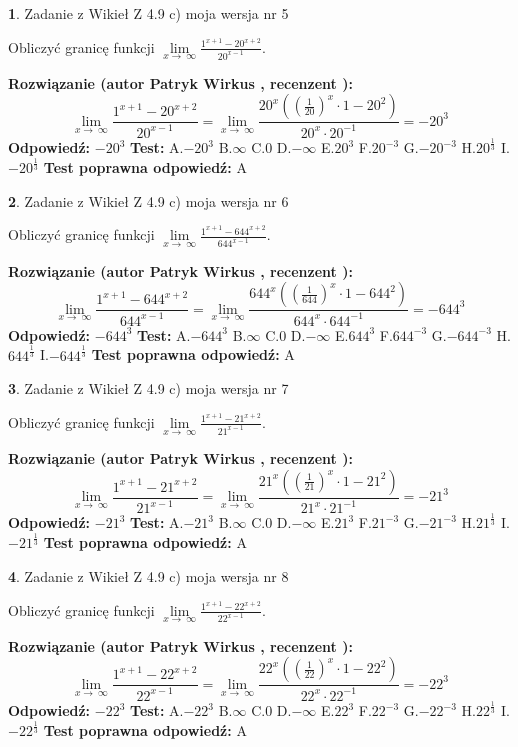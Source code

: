 \documentclass[12pt, a4paper]{article}
\theoremstyle{definition} %
\newtheorem{zad}{}
\newcommand{\zadStart}[1]{\begin{zad}#1\newline}
\newcommand{\zadStop}{\end{zad}}
\newcommand{\rozwStart}[2]{\noindent \textbf{Rozwiązanie (autor #1 , recenzent #2): }\newline}
\newcommand{\rozwStop}{\newline}
\newcommand{\odpStart}{\noindent \textbf{Odpowiedź:}\newline}
\newcommand{\odpStop}{\newline}
\newcommand{\testStart}{\noindent \textbf{Test:}\newline}
\newcommand{\testStop}{\newline}
\newcommand{\kluczStart}{\noindent \textbf{Test poprawna odpowiedź:}\newline}
\newcommand{\kluczStop}{\newline}
\begin{document}
\zadStart{Zadanie z Wikieł Z 4.9 c) moja wersja nr 5}


Obliczyć granicę funkcji  $\lim\limits_{x\to\ \infty}\frac{1^{x+1}-20^{x+2}}{20^{x-1}}$.
\zadStop
\rozwStart{Patryk Wirkus}{}
$$\lim\limits_{x\to\ \infty}\frac{1^{x+1}-20^{x+2}}{20^{x-1}}=\lim\limits_{x\to\ \infty}\frac{20^{x}((\frac{1}{20})^{x}\cdot 1 -20^{2})}{20^{x}\cdot 20^{-1}} = -20^{3}$$
\rozwStop
\odpStart
$-20^{3}$
\odpStop
\testStart
A.$-20^{3}$ B.$\infty$ C.$0$ D.$-\infty$ E.$20^{3}$
F.$20^{-3}$ G.$-20^{-3}$
H.$20^{\frac{1}{3}}$
I.$-20^{\frac{1}{3}}$
\testStop
\kluczStart
A
\kluczStop



\zadStart{Zadanie z Wikieł Z 4.9 c) moja wersja nr 6}


Obliczyć granicę funkcji  $\lim\limits_{x\to\ \infty}\frac{1^{x+1}-644^{x+2}}{644^{x-1}}$.
\zadStop
\rozwStart{Patryk Wirkus}{}
$$\lim\limits_{x\to\ \infty}\frac{1^{x+1}-644^{x+2}}{644^{x-1}}=\lim\limits_{x\to\ \infty}\frac{644^{x}((\frac{1}{644})^{x}\cdot 1 -644^{2})}{644^{x}\cdot 644^{-1}} = -644^{3}$$
\rozwStop
\odpStart
$-644^{3}$
\odpStop
\testStart
A.$-644^{3}$ B.$\infty$ C.$0$ D.$-\infty$ E.$644^{3}$
F.$644^{-3}$ G.$-644^{-3}$
H.$644^{\frac{1}{3}}$
I.$-644^{\frac{1}{3}}$
\testStop
\kluczStart
A
\kluczStop



\zadStart{Zadanie z Wikieł Z 4.9 c) moja wersja nr 7}


Obliczyć granicę funkcji  $\lim\limits_{x\to\ \infty}\frac{1^{x+1}-21^{x+2}}{21^{x-1}}$.
\zadStop
\rozwStart{Patryk Wirkus}{}
$$\lim\limits_{x\to\ \infty}\frac{1^{x+1}-21^{x+2}}{21^{x-1}}=\lim\limits_{x\to\ \infty}\frac{21^{x}((\frac{1}{21})^{x}\cdot 1 -21^{2})}{21^{x}\cdot 21^{-1}} = -21^{3}$$
\rozwStop
\odpStart
$-21^{3}$
\odpStop
\testStart
A.$-21^{3}$ B.$\infty$ C.$0$ D.$-\infty$ E.$21^{3}$
F.$21^{-3}$ G.$-21^{-3}$
H.$21^{\frac{1}{3}}$
I.$-21^{\frac{1}{3}}$
\testStop
\kluczStart
A
\kluczStop



\zadStart{Zadanie z Wikieł Z 4.9 c) moja wersja nr 8}


Obliczyć granicę funkcji  $\lim\limits_{x\to\ \infty}\frac{1^{x+1}-22^{x+2}}{22^{x-1}}$.
\zadStop
\rozwStart{Patryk Wirkus}{}
$$\lim\limits_{x\to\ \infty}\frac{1^{x+1}-22^{x+2}}{22^{x-1}}=\lim\limits_{x\to\ \infty}\frac{22^{x}((\frac{1}{22})^{x}\cdot 1 -22^{2})}{22^{x}\cdot 22^{-1}} = -22^{3}$$
\rozwStop
\odpStart
$-22^{3}$
\odpStop
\testStart
A.$-22^{3}$ B.$\infty$ C.$0$ D.$-\infty$ E.$22^{3}$
F.$22^{-3}$ G.$-22^{-3}$
H.$22^{\frac{1}{3}}$
I.$-22^{\frac{1}{3}}$
\testStop
\kluczStart
A
\kluczStop
\end{document}
